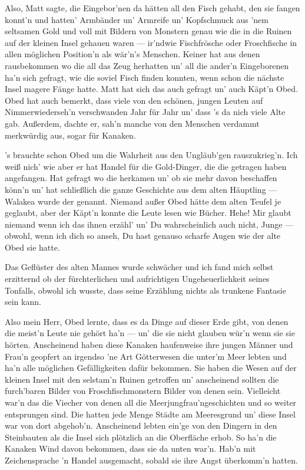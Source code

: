 Also, Matt sagte, die Eingebor'nen da hätten all den Fisch gehabt, den sie fangen konnt'n und hatten' Armbänder un' Armreife un' Kopfschmuck aus 'nem seltsamen Gold und voll mit Bildern von Monstern genau wie die in die Ruinen auf der kleinen Insel gehauen waren --- ir'ndwie Fischfrösche oder Froschfische in allen möglichen Position'n als wär'n's Menschen. Keiner hat aus denen rausbekommen wo die all das Zeug herhatten un' all die ander'n Eingeborenen ha'n sich gefragt, wie die soviel Fisch finden konnten, wenn schon die nächste Insel magere Fänge hatte. Matt hat sich das auch gefragt un' auch Käpt'n Obed. Obed hat auch bemerkt, dass viele von den schönen, jungen Leuten auf Nimmerwiederseh'n verschwanden Jahr für Jahr un' dass 's da nich viele Alte gab. Außerdem, dachte er, sah'n manche von den Menschen verdammt merkwürdig aus, sogar für Kanaken.

's brauchte schon Obed um die Wahrheit aus den Ungläub'gen rauszukrieg'n. Ich weiß nich' wie aber er hat Handel für die Gold-Dinger, die die getragen haben angefangen. Hat gefragt wo die herkamen un' ob sie mehr davon beschaffen könn'n un' hat schließlich die ganze Geschichte aus dem alten Häuptling --- Walakea wurde der genannt. Niemand außer Obed hätte dem alten Teufel je geglaubt, aber der Käpt'n konnte die Leute lesen wie Bücher. Hehe! Mir glaubt niemand wenn ich das ihnen erzähl' un' Du wahrscheinlich auch nicht, Junge --- obwohl, wenn ich dich so anseh, Du hast genauso scharfe Augen wie der alte Obed sie hatte.\grqq

Das Geflüster des alten Mannes wurde schwächer und ich fand mich selbst erzitternd ob der fürchterlichen und aufrichtigen Ungeheuerlichkeit seines Tonfalls, obwohl ich wusste, dass seine Erzählung nichts als trunkene Fantasie sein kann.

\glqq Also mein Herr, Obed lernte, dass es da Dinge auf dieser Erde gibt, von denen die meist'n Leute nie gehört ha'n --- un' die sie nicht glauben wür'n wenn sie sie hörten. Anscheinend haben diese Kanaken haufenweise ihre jungen Männer und Frau'n geopfert an irgendso 'ne Art Götterwesen die unter'm Meer lebten und ha'n alle möglichen Gefälligkeiten dafür bekommen. Sie haben die Wesen auf der kleinen Insel mit den selstam'n Ruinen getroffen un' anscheinend sollten die furch'baren Bilder von Froschfischmonstern Bilder von denen sein. Vielleicht war'n das die Viecher von denen all die Meerjungfrau'ngeschichten und so weiter entsprungen sind. Die hatten jede Menge Städte am Meeresgrund un' diese Insel war von dort abgehob'n. Anscheinend lebten ein'ge von den Dingern in den Steinbauten als die Insel sich plötzlich an die Oberfläche erhob. So ha'n die Kanaken Wind davon bekommen, dass sie da unten war'n. Hab'n mit Zeichensprache 'n Handel ausgemacht, sobald sie ihre Angst überkomm'n hatten.

